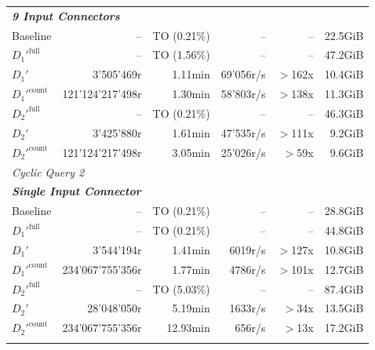 \begin{longtable}{lrrrrr}
    \multicolumn{6}{l}{\textit{\textbf{9 Input Connectors}}} \\
    \nopagebreak
    Baseline              &  --                   &  TO (0.21\%)        &  --                  & --                & 22.5GiB   \\
    $D_1'^{\text{full}}$   &  --                   &  TO (1.56\%)        &  --                  & --                & 47.2GiB   \\
    \quad $D_1'$           &  3'505'469r           &  1.11min            &  69'056r/s           & $>$162x           & 10.4GiB   \\
    $D_1'^{\text{count}}$  &  121'124'217'498r     &  1.30min            &  58'803r/s           & $>$138x           & 11.3GiB   \\
    $D_2'^{\text{full}}$   &  --                   &  TO (0.21\%)        &  --                  & --                & 46.3GiB   \\
    \quad $D_2'$           &  3'425'880r           &  1.61min            &  47'535r/s           & $>$111x           & 9.2GiB    \\
    $D_2'^{\text{count}}$  &  121'124'217'498r     &  3.05min            &  25'026r/s           & $>$59x            & 9.6GiB    \\
    \midrule


    \multicolumn{6}{l}{\textit{Cyclic Query 2}} \\
    \midrule
    \multicolumn{6}{l}{\textit{\textbf{Single Input Connector}}} \\
    \nopagebreak
    Baseline               &  --                   &  TO (0.21\%)        &  --                  & --                & 28.8GiB   \\
    $D_1'^{\text{full}}$   &  --                   &  TO (0.21\%)        &  --                  & --                & 44.8GiB   \\
    \quad $D_1'$           &  3'544'194r           &  1.41min            &  6019r/s             & $>$127x           & 10.8GiB   \\
    $D_1'^{\text{count}}$  &  234'067'755'356r     &  1.77min            &  4786r/s             & $>$101x           & 12.7GiB   \\
    $D_2'^{\text{full}}$   &  --                   &  TO (5.03\%)        &  --                  & --                & 87.4GiB   \\
    \quad $D_2'$           &  28'048'050r          &  5.19min            &  1633r/s             & $>$34x            & 13.5GiB   \\
    $D_2'^{\text{count}}$  &  234'067'755'356r     &  12.93min           &  656r/s              & $>$13x            & 17.2GiB   \\
    \addlinespace
    

\end{longtable}
